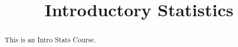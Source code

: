 \documentclass{xourse}
\title{Introductory Statistics}%
\begin{document}
      
\begin{abstract} %
This is an Intro Stats Course.
\end{abstract}
      
\maketitle
      



      

      


      
\end{document}
